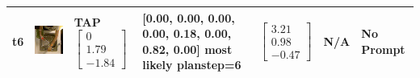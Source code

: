\begin{longtable}{| V{0.8cm} | V{2.6cm} | V{1.6cm} | V{2.1cm} | V{1.55cm} | V{1.6cm} | V{3.2cm} |}
t6 &
\includegraphics[width=\linewidth]{fig/system/_fast2-tap2_.jpg} &
TAP
\linebreak\linebreak
$\begin{bmatrix}
0 \\
1.79 \\
-1.84
\end{bmatrix}$ &
[0.00, 0.00, 0.00, 0.00, 0.18, 0.00, 0.82, 0.00] most likely planstep=6 &
$\begin{bmatrix}
3.21 \\
0.98 \\
-0.47
\end{bmatrix}$ &
N/A &
No Prompt
\\ \hline



\end{longtable}

